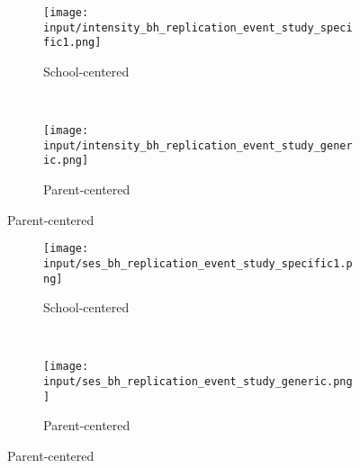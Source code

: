 \begin{figure}
  \caption{Search Intensity}
    \centering
    \begin{subfigure}[t]{0.5\textwidth}
    \caption{School-centered}
        \centering
        \texttt{[image: input/intensity\_bh\_replication\_event\_study\_specific1.png]}
    \end{subfigure}%
    ~
    \begin{subfigure}[t]{0.5\textwidth}
    \caption{Parent-centered}
        \centering
        \texttt{[image: input/intensity\_bh\_replication\_event\_study\_generic.png]}
    \end{subfigure}
\end{figure}

\begin{figure}
  \caption{High-Low SES Search Intensity Gap}
    \centering
    \begin{subfigure}[t]{0.5\textwidth}
    \caption{School-centered}
        \centering
        \texttt{[image: input/ses\_bh\_replication\_event\_study\_specific1.png]}
    \end{subfigure}%
    ~
    \begin{subfigure}[t]{0.5\textwidth}
    \caption{Parent-centered}
        \centering
        \texttt{[image: input/ses\_bh\_replication\_event\_study\_generic.png]}
    \end{subfigure}
\end{figure}



